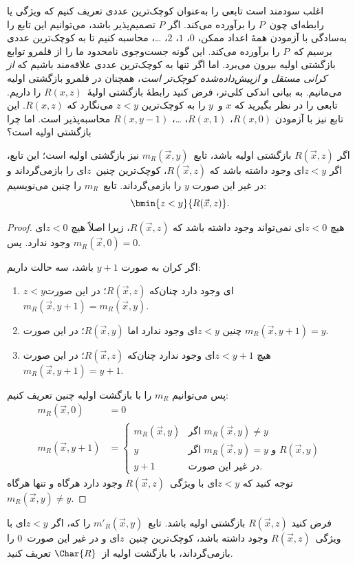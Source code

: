 \documentclass[../../../include/open-logic-section]{subfiles}
\begin{document}

\begin{explain}
اغلب سودمند است تابعی را به‌عنوان کوچک‌ترین عددی تعریف کنیم که ویژگی
یا رابطه‌ای چون~$P$ را برآورده می‌کند. اگر $P$ تصمیم‌پذیر باشد،
می‌توانیم این تابع را به‌سادگی با آزمودن همهٔ اعداد ممکن،
$0$، $1$، $2$، \dots، محاسبه کنیم تا به کوچک‌ترین عددی برسیم که~$P$
را برآورده می‌کند. این گونه جست‌وجوی نامحدود ما را از قلمرو توابع
بازگشتی اولیه بیرون می‌برد. اما اگر تنها به کوچک‌ترین عددی علاقه‌مند
باشیم که 
\emph{از کرانی مستقل و ازپیش‌داده‌شده کوچک‌تر است}، همچنان در قلمرو
بازگشتی اولیه می‌مانیم. به بیانی اندکی کلی‌تر، فرض کنید رابطهٔ
بازگشتی اولیهٔ~$R(x,z)$ را داریم. تابعی را در نظر بگیرید که $x$ و~$y$
را به کوچک‌ترین $z<y$ می‌نگارد که $R(x,z)$. این تابع نیز با آزمودن
$R(x,0)$، $R(x,1)$، \dots، $R(x,y-1)$ محاسبه‌پذیر است. اما چرا
بازگشتی اولیه است؟
\end{explain}

\begin{prop}
اگر $R(\vec x,z)$ بازگشتی اولیه باشد، تابع~$m_R(\vec x,y)$ نیز
بازگشتی اولیه است؛ این تابع، اگر $z<y$ای وجود داشته باشد که
$R(\vec x,z)$، کوچک‌ترین چنین~$z$ای را بازمی‌گرداند و در غیر این صورت
$y$ را بازمی‌گرداند. تابع~$m_R$ را چنین می‌نویسیم:
\[
\bmin{z < y}{R(\vec{x}, z)}.
\]
\end{prop}

\begin{proof}
هیچ $z<0$ای نمی‌تواند وجود داشته باشد که $R(\vec x,z)$، زیرا اصلاً
هیچ $z<0$ای وجود ندارد. پس $m_R(\vec x,0)=0$.

اگر کران به صورت $y+1$ باشد، سه حالت داریم:
\begin{enumerate}
\item $z<y$ای وجود دارد چنان‌که $R(\vec{x},z)$؛ در این صورت
$m_R(\vec{x},y+1)=m_R(\vec{x},y)$.
\item چنین $z<y$ای وجود ندارد اما $R(\vec{x},y)$؛ در این صورت
$m_R(\vec{x},y+1)=y$.
\item هیچ $z<y+1$ای وجود ندارد چنان‌که $R(\vec{x},z)$؛ در این صورت
$m_R(\vec{x},y+1)=y+1$.
\end{enumerate}
پس می‌توانیم $m_R$ را با بازگشت اولیه چنین تعریف کنیم:
\begin{align*}
m_R(\vec{x}, 0) & = 0\\
m_R(\vec{x}, y+1) & =
\begin{cases}
m_R(\vec{x}, y) & \text{اگر $m_R(\vec x, y) \neq y$}\\
y & \text{اگر $m_R(\vec x, y) = y$ و $R(\vec{x}, y)$}\\
y+1 & \text{در غیر این صورت}.
\end{cases}
\end{align*}
توجه کنید که $z<y$ای با ویژگی~$R(\vec x,z)$ وجود دارد هرگاه و تنها
هرگاه $m_R(\vec x,y) \neq y$.
\end{proof}

\begin{prob}
فرض کنید $R(\vec x,z)$ بازگشتی اولیه باشد. تابع~$m'_R(\vec x,y)$ را
که، اگر $z<y$ای با ویژگی~$R(\vec x,z)$ وجود داشته باشد، کوچک‌ترین
چنین~$z$ای و در غیر این صورت~$0$ را بازمی‌گرداند، با بازگشت اولیه
از~$\Char{R}$ تعریف کنید.
\end{prob}
\end{document}
